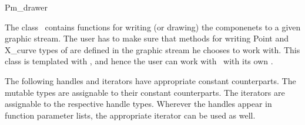 
\ccRefPageBegin


\begin{ccRefConcept}{Pm_drawer}


\ccDefinition
The class \ccRefName\ contains functions for writing (or drawing) the  componenets to a given graphic stream. 
The user has to make sure that methods for writing Point and X_curve types of  are defined in the graphic stream he chooses to work with.
This class is templated with , and hence the user can work with \ccRefName\ with its own . 
 

\ccTypes

The following handles and iterators have appropriate constant counterparts. The mutable types are assignable to their
constant counterparts. The iterators are assignable to the respective handle types. 
Wherever the handles appear in function parameter lists, the appropriate iterator can be used as well. 

\end{ccRefConcept}
